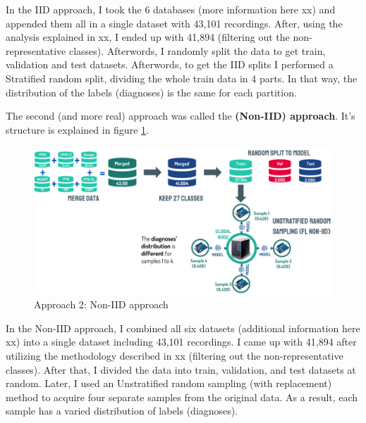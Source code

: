 In the IID approach, I took the 6 databases (more information here xx) and appended them all in a single dataset with 43,101 recordings. After, using the analysis explained in xx, I ended up with 41,894 (filtering out the non-representative classes). Afterwords, I randomly split the data to get train, validation and test datasets. Afterwords, to get the IID splits I performed a Stratified random split, dividing the whole train data in 4 parts. In that way, the distribution of the labels (diagnoses) is the same for each partition.

The second (and more real) approach was called the \textbf{(Non-IID) approach}. It's structure is explained in figure \ref{fig:fl_approach2}.

\begin{figure}[H]
\centering
\includegraphics[scale=0.4]{img/fl_approach2.png}
\caption{Approach 2: Non-IID approach}
\label{fig:fl_approach2}
\end{figure}

In the Non-IID approach, I combined all six datasets (additional information here xx) into a single dataset including 43,101 recordings. I came up with 41,894 after utilizing the methodology described in xx (filtering out the non-representative classes). After that, I divided the data into train, validation, and test datasets at random. Later, I used an Unstratified random sampling (with replacement) method to acquire four separate samples from the original data. As a result, each sample has a varied distribution of labels (diagnoses).



























